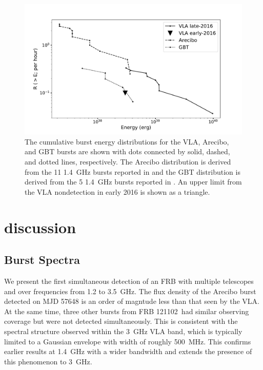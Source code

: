 \documentclass[twocolumn]{aastex61}
\newcommand{\frb}{FRB 121102}
\begin{document}
\begin{figure}[htb]
\begin{center}
\includegraphics[width=\columnwidth]{energy_disn}
\caption{The cumulative burst energy distributions for the VLA, Arecibo, and GBT bursts are shown with dots connected by solid, dashed, and dotted lines, respectively. The Arecibo distribution is derived from the 11 1.4~GHz bursts reported in \citet{2016Natur.531..202S} and the GBT distribution is derived from the 5 1.4~GHz bursts reported in \citet{2016arXiv160308880S}. An upper limit from the VLA nondetection in early 2016 is shown as a triangle. \label{fig:ed}}
\end{center}
\end{figure}

\section{discussion}
\label{sec:disc}
\subsection{Burst Spectra}

We present the first simultaneous detection of an FRB with multiple telescopes and over frequencies from 1.2 to 3.5~GHz. The flux density of the Arecibo burst detected on MJD 57648 is an order of magntude less than that seen by the VLA. At the same time, three other bursts from \frb\ had similar observing coverage but were not detected simultaneously. This is consistent with the spectral structure observed within the 3~GHz VLA band, which is typically limited to a Gaussian envelope with width of roughly 500~MHz. This confirms earlier results at 1.4~GHz \citep{2016Natur.531..202S,2016arXiv160308880S} with a wider bandwidth and extends the presence of this phenomenon to 3~GHz.
\end{document}
